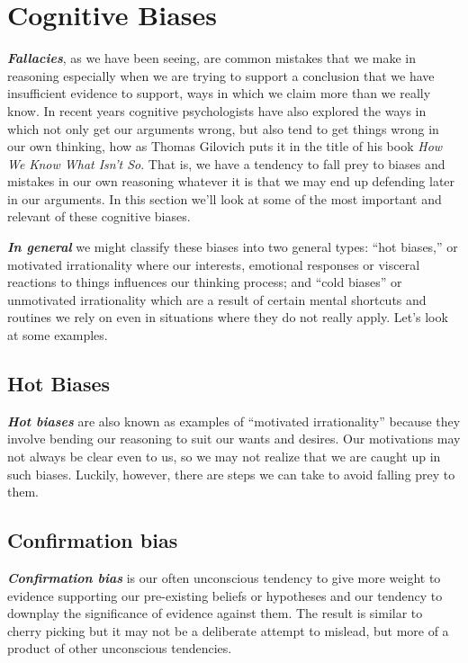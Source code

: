 \documentclass[]{book}
\begin{document}
\hypertarget{cognitive-biases}{%
\section{Cognitive Biases}\label{cognitive-biases}}

\textbf{\emph{Fallacies}}, as we have been seeing, are common mistakes that we make in reasoning especially when we are trying to support a conclusion that we have insufficient evidence to support, ways in which we claim more than we really know. In recent years cognitive psychologists have also explored the ways in which not only get our arguments wrong, but also tend to get things wrong in our own thinking, how as Thomas Gilovich puts it in the title of his book \emph{How We Know What Isn't So}.\citep{gilovichHowWeKnow1991} That is, we have a tendency to fall prey to biases and mistakes in our own reasoning whatever it is that we may end up defending later in our arguments. In this section we'll look at some of the most important and relevant of these cognitive biases.

\textbf{\emph{In general}} we might classify these biases into two general types: ``hot biases,'' or motivated irrationality where our interests, emotional responses or visceral reactions to things influences our thinking process; and ``cold biases'' or unmotivated irrationality which are a result of certain mental shortcuts and routines we rely on even in situations where they do not really apply. Let's look at some examples.

\hypertarget{hot-biases}{%
\subsection*{\texorpdfstring{\textbf{Hot Biases}}{Hot Biases}}\label{hot-biases}}


\textbf{\emph{Hot biases}} are also known as examples of ``motivated irrationality'' because they involve bending our reasoning to suit our wants and desires. Our motivations may not always be clear even to us, so we may not realize that we are caught up in such biases. Luckily, however, there are steps we can take to avoid falling prey to them.

\hypertarget{confirmation-bias}{%
\subsection*{Confirmation bias}\label{confirmation-bias}}


\textbf{\emph{Confirmation bias}} is our often unconscious tendency to give more weight to evidence supporting our pre-existing beliefs or hypotheses and our tendency to downplay the significance of evidence against them. The result is similar to cherry picking but it may not be a deliberate attempt to mislead, but more of a product of other unconscious tendencies.
\end{document}
